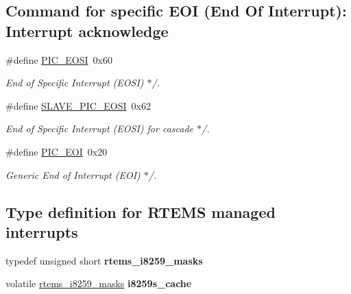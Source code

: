 \subsection*{Command for specific E\+OI (End Of Interrupt)\+: Interrupt acknowledge}
\begin{DoxyCompactItemize}
\item 
\mbox{\label{group__mips__i8259__irq_ga870dd62bbf5648027756646c08804680}} 
\#define \mbox{\hyperlink{group__mips__i8259__irq_ga870dd62bbf5648027756646c08804680}{P\+I\+C\+\_\+\+E\+O\+SI}}~0x60
\begin{DoxyCompactList}\small\item\em End of Specific Interrupt (E\+O\+SI) $\ast$/. \end{DoxyCompactList}\item 
\mbox{\label{group__mips__i8259__irq_gafb66965d7c27635f99e9431dd7d23225}} 
\#define \mbox{\hyperlink{group__mips__i8259__irq_gafb66965d7c27635f99e9431dd7d23225}{S\+L\+A\+V\+E\+\_\+\+P\+I\+C\+\_\+\+E\+O\+SI}}~0x62
\begin{DoxyCompactList}\small\item\em End of Specific Interrupt (E\+O\+SI) for cascade $\ast$/. \end{DoxyCompactList}\item 
\mbox{\label{group__mips__i8259__irq_ga170d8eebdb48c16cfcd60cbd46760cb2}} 
\#define \mbox{\hyperlink{group__mips__i8259__irq_ga170d8eebdb48c16cfcd60cbd46760cb2}{P\+I\+C\+\_\+\+E\+OI}}~0x20
\begin{DoxyCompactList}\small\item\em Generic End of Interrupt (E\+OI) $\ast$/. \end{DoxyCompactList}\end{DoxyCompactItemize}
\subsection*{Type definition for R\+T\+E\+MS managed interrupts}
\begin{DoxyCompactItemize}
\item 
\mbox{\label{group__mips__i8259__irq_gabcb5f2200fea51d658c5ed728282ee77}} 
typedef unsigned short {\bfseries rtems\+\_\+i8259\+\_\+masks}
\item 
\mbox{\label{group__mips__i8259__irq_gadd37c5c2c80255302af1ac5f73679cba}} 
volatile \mbox{\hyperlink{group__i386__irq_gabcb5f2200fea51d658c5ed728282ee77}{rtems\+\_\+i8259\+\_\+masks}} {\bfseries i8259s\+\_\+cache}
\end{DoxyCompactItemize}
